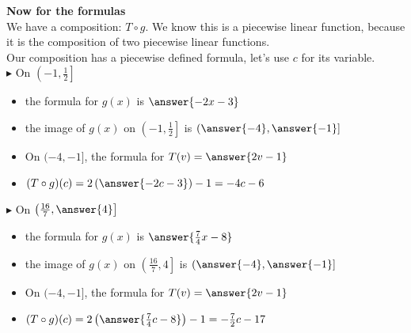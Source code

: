 \documentclass{ximera}
\begin{document}
\begin{explanation}



\textbf{\textcolor{purple!85!blue}{Now for the formulas}} \\


We have a composition: $T \circ g$.  We know this is a piecewise linear function, because it is the composition of two piecewise linear functions. \\

Our composition has a piecewise defined formula, let's use $c$ for its variable. \\





$\blacktriangleright$ On $\left( -1, \frac{1}{2} \right]$




\begin{itemize}

\item the formula for $g(x)$ is $\answer{-2x-3}$
\item the image of $g(x)$ on $\left( -1, \frac{1}{2} \right]$ is $\left( \answer{-4}, \answer{-1} \right]$
\item On $( -4, -1 ]$, the formula for $T(v) = \answer{2v-1}$  \\
\item $(T \circ g)(c) = 2 \left(\answer{-2c-3}\right) - 1 = -4c - 6$ \\


\end{itemize}








$\blacktriangleright$ On $\left( \frac{16}{7}, \answer{4} \right]$



\begin{itemize}

\item the formula for $g(x)$ is $\answer{\frac{7}{4}x - 8}$
\item the image of $g(x)$ on $\left( \frac{16}{7}, 4 \right]$ is $\left( \answer{-4}, \answer{-1} \right]$
\item On $( -4, -1 ]$, the formula for $T(v) = \answer{2v-1}$  \\
\item $(T \circ g)(c) = 2\left(\answer{\frac{7}{4}c - 8}\right) - 1 = -\frac{7}{2}c - 17$ \\



\end{itemize}
\end{explanation}
\end{document}

